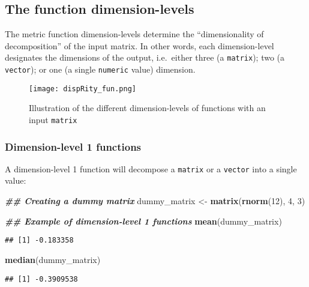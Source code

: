 \documentclass[
]{book}
\newenvironment{Shaded}{\begin{snugshade}}{\end{snugshade}}
\newcommand{\DecValTok}[1]{\textcolor[rgb]{0.00,0.00,0.81}{#1}}
\newcommand{\DocumentationTok}[1]{\textcolor[rgb]{0.56,0.35,0.01}{\textbf{\textit{#1}}}}
\newcommand{\FunctionTok}[1]{\textcolor[rgb]{0.13,0.29,0.53}{\textbf{#1}}}
\newcommand{\NormalTok}[1]{#1}
\newcommand{\OtherTok}[1]{\textcolor[rgb]{0.56,0.35,0.01}{#1}}
\begin{document}
\hypertarget{the-function-dimension-levels}{%
\subsection{The function dimension-levels}\label{the-function-dimension-levels}}

The metric function dimension-levels determine the ``dimensionality of decomposition'' of the input matrix.
In other words, each dimension-level designates the dimensions of the output, i.e.~either three (a \texttt{matrix}); two (a \texttt{vector}); or one (a single \texttt{numeric} value) dimension.

\begin{figure}
\centering
\texttt{[image: dispRity\_fun.png]}
\caption{Illustration of the different dimension-levels of functions with an input \texttt{matrix}}
\end{figure}

\hypertarget{dimension-level-1-functions}{%
\subsubsection{Dimension-level 1 functions}\label{dimension-level-1-functions}}

A dimension-level 1 function will decompose a \texttt{matrix} or a \texttt{vector} into a single value:

\begin{Shaded}
\begin{Highlighting}[]
\DocumentationTok{\#\# Creating a dummy matrix}
\NormalTok{dummy\_matrix }\OtherTok{\textless{}{-}} \FunctionTok{matrix}\NormalTok{(}\FunctionTok{rnorm}\NormalTok{(}\DecValTok{12}\NormalTok{), }\DecValTok{4}\NormalTok{, }\DecValTok{3}\NormalTok{)}

\DocumentationTok{\#\# Example of dimension{-}level 1 functions}
\FunctionTok{mean}\NormalTok{(dummy\_matrix)}
\end{Highlighting}
\end{Shaded}

\begin{verbatim}
## [1] -0.183358
\end{verbatim}

\begin{Shaded}
\begin{Highlighting}[]
\FunctionTok{median}\NormalTok{(dummy\_matrix)}
\end{Highlighting}
\end{Shaded}

\begin{verbatim}
## [1] -0.3909538
\end{verbatim}
\end{document}
